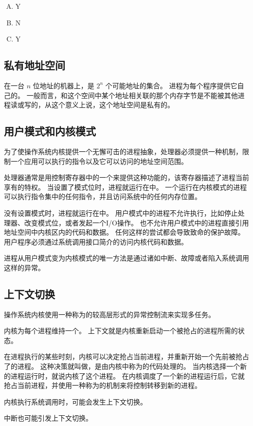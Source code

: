 {{        %
        \begin{practicec}
            \begin{enumerate}[A.]
                \item Y
                \item N
                \item Y
            \end{enumerate}
        \end{practicec}
    }

    \subsection{私有地址空间}
    {
        在一台 $n$ 位地址的机器上，是 $2^n$ 个可能地址的集合。
        进程为每个程序提供它自己的。
        一般而言，和这个空间中某个地址相关联的那个内存字节是不能被其他进程读或写的，从这个意义上说，这个地址空间是私有的。
    }

    \subsection{用户模式和内核模式}
    {
        为了使操作系统内核提供一个无懈可击的进程抽象，处理器必须提供一种机制，限制一个应用可以执行的指令以及它可以访问的地址空间范围。

        处理器通常是用控制寄存器中的一个来提供这种功能的，该寄存器描述了进程当前享有的特权。
        当设置了模式位时，进程就运行在中。
        一个运行在内核模式的进程可以执行指令集中的任何指令，并且访问系统中的任何内存位置。

        没有设置模式时，进程就运行在中。
        用户模式中的进程不允许执行，比如停止处理器、改变模式位，或者发起一个I/O操作。
        也不允许用户模式中的进程直接引用地址空间中内核区内的代码和数据。
        任何这样的尝试都会导致致命的保护故障。
        用户程序必须通过系统调用接口简介的访问内核代码和数据。

        进程从用户模式变为内核模式的唯一方法是通过诸如中断、故障或者陷入系统调用这样的异常。
    }

    \subsection{上下文切换}
    {
        操作系统内核使用一种称为的较高层形式的异常控制流来实现多任务。

        内核为每个进程维持一个。
        上下文就是内核重新启动一个被抢占的进程所需的状态。

        在进程执行的某些时刻，内核可以决定抢占当前进程，并重新开始一个先前被抢占了的进程。
        这种决策就叫做，是由内核中称为的代码处理的。
        当内核选择一个新的进程运行时，就说内核了这个进程。
        在内核调度了一个新的进程运行后，它就抢占当前进程，并使用一种称为的机制来将控制转移到新的进程。

        内核执行系统调用时，可能会发生上下文切换。

        中断也可能引发上下文切换。
    }
}
